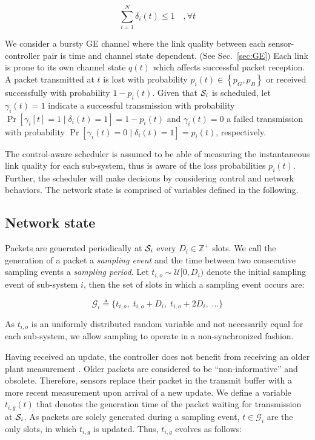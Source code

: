 \begin{equation}
  \sum_{i=1}^{N}{\delta_i(t) \leq 1 \quad, \forall t}
\end{equation}

We consider a bursty GE channel where the link quality between each
sensor-controller pair is time and channel state dependent. (See
Sec.~{\ref{sec:GE}}) Each link is prone to its own channel state $q(t)$ which
affects successful packet reception. A packet transmitted at $t$ is lost with
probability $p_i(t) \in \left\{p_G,p_B\right\}$ or received successfully with
probability $1-p_i(t)$. Given that $\mathcal{S}_i$ is scheduled, let $\gamma_i(t)=1$
indicate a successful transmission with probability $\Pr[\gamma_i[t]=1 \mid
\delta_i(t)=1] = 1-p_i(t)$ and $\gamma_i(t)=0$ a failed transmission with
probability $\Pr[\gamma_i(t)=0 \mid \delta_i(t)=1] = p_i(t)$, respectively. 


The control-aware scheduler is assumed to be able of measuring the instantaneous
link quality for each sub-system, thus is aware of the loss probabilities
$p_i(t)$. Further, the scheduler will make decisions by considering control and
network behaviors. The network state is comprised of variables defined in the
following.

\subsection*{Network state}

Packets are generated periodically at $\mathcal{S}_i$ every $D_i \in \mathbb{Z}^+$
slots. We call the generation of a packet a \textit{sampling event} and the time
between two consecutive sampling events a \textit{sampling period}. Let $t_{i,o}
\sim \mathcal{U}[0, D_i)$ denote the initial sampling event of sub-system $i$,
then the set of slots in which a sampling event occurs are:

\begin{equation}
  \mathcal{G}_i \triangleq \lbrace t_{i,o}, \; t_{i,o} + D_{i}, \; t_{i,o} + 2 D_{i}, \; \dots \rbrace 
\end{equation}

As $t_{i,o}$ is an uniformly distributed random variable and not necessarily
equal for each sub-system, we allow sampling to operate in a non-synchronized
fashion. 

Having received an update, the controller does not benefit from receiving an
older plant measurement \cite{costa2016age}. Older packets are considered to be
``non-informative'' and obsolete. Therefore, sensors replace their packet in the
transmit buffer with a more recent measurement upon arrival of a new update. We
define a variable $t_{i,g}(t)$ that denotes the generation time of the packet
waiting for transmission at $\mathcal{S}_i$. As packets are solely generated during a
sampling event, $t \in \mathcal{G}_i$ are the only slots, in which $t_{i,g}$ is
updated. Thus, $t_{i,g}$ evolves as follows:


